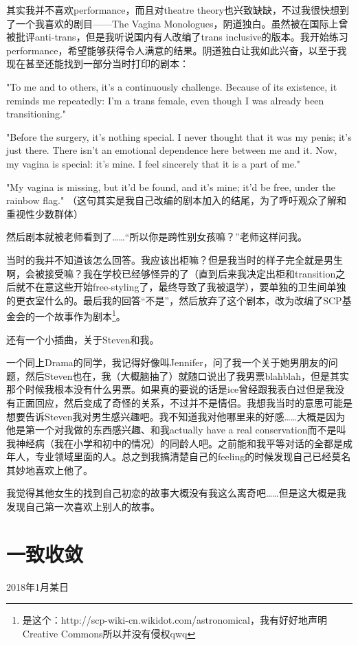 \documentclass{article}
\begin{document}
其实我并不喜欢performance，而且对theatre theory也兴致缺缺，不过我很快想到了一个我喜欢的剧目——The Vagina Monologues，阴道独白。虽然被在国际上曾被批评anti-trans，但是我听说国内有人改编了trans inclusive的版本。我开始练习performance，希望能够获得令人满意的结果。阴道独白让我如此兴奋，以至于我现在甚至还能找到一部分当时打印的剧本：

"To me and to others, it's a continuously challenge. Because of its existence, it reminds me repeatedly: I'm a trans female, even though I was already been transitioning."

"Before the surgery, it's nothing special. I never thought that it was my penis; it's just there. There isn't an emotional dependence here between me and it. Now, my vagina is special: it's mine. I feel sincerely that it is a part of me."

"My vagina is missing, but it'd be found, and it's mine; it'd be free, under the rainbow flag." （这句其实是我自己改编的剧本加入的结尾，为了呼吁观众了解和重视性少数群体）

然后剧本就被老师看到了……“所以你是跨性别女孩嘛？”老师这样问我。

当时的我并不知道该怎么回答。我应该出柜嘛？但是我当时的样子完全就是男生啊，会被接受嘛？我在学校已经够怪异的了（直到后来我决定出柜和transition之后就不在意这些开始free-styling了，最终导致了我被退学），要单独的卫生间单独的更衣室什么的。最后我的回答“不是”，然后放弃了这个剧本，改为改编了SCP基金会的一个故事作为剧本\footnote{是这个：http://scp-wiki-cn.wikidot.com/astronomical，我有好好地声明Creative Commons所以并没有侵权qwq}。

还有一个小插曲，关于Steven和我。

一个同上Drama的同学，我记得好像叫Jennifer，问了我一个关于她男朋友的问题，然后Steven也在，我（大概脑抽了）就随口说出了我男票blahblah，但是其实那个时候我根本没有什么男票。如果真的要说的话是ice曾经跟我表白过但是我没有正面回应，然后变成了奇怪的关系，不过并不是情侣。我想我当时的意思可能是想要告诉Steven我对男生感兴趣吧。我不知道我对他哪里来的好感……大概是因为他是第一个对我做的东西感兴趣、和我actually have a real conservation而不是叫我神经病（我在小学和初中的情况）的同龄人吧。之前能和我平等对话的全都是成年人，专业领域里面的人。总之到我搞清楚自己的feeling的时候发现自己已经莫名其妙地喜欢上他了。

我觉得其他女生的找到自己初恋的故事大概没有我这么离奇吧……但是这大概是我发现自己第一次喜欢上别人的故事。

\section{一致收敛}
2018年1月某日
\end{document}
